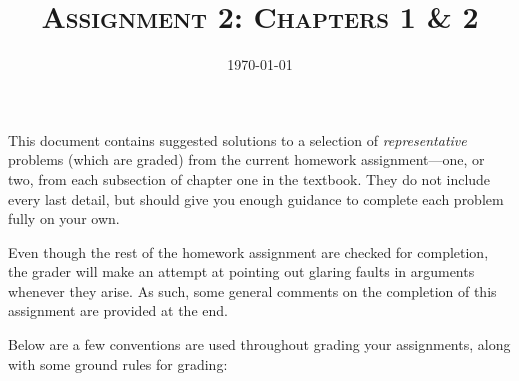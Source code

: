 \documentclass{amsart}
\title{\textsc{Assignment 2: Chapters 1 \& 2}}
\date{\today}
\theoremstyle{definition}
\theoremstyle{definition}
\DeclareMathOperator{\1}{\mathbbm{1}}
\begin{document}
	\sloppy
	\maketitle
	
	
	This document contains suggested solutions to a selection of \textit{representative} problems (which are graded) from the current homework assignment---one, or two, from each subsection of chapter one in the textbook. They do not include every last detail, but should give you enough guidance to complete each problem fully on your own. 
	
	Even though the rest of the homework assignment are checked for completion, the grader will make an attempt at pointing out glaring faults in arguments whenever they arise. As such, some general comments on the completion of this assignment are provided at the end. 
	
	Below are a few conventions are used throughout grading your assignments, along with some ground rules for grading:
	
\end{document}
